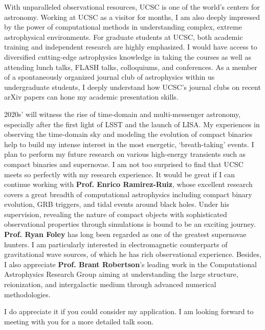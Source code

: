 \documentclass[11pt, a4paper]{awesome-cv} %
\begin{document}
\makecvheader %



\begin{cvletter}




With unparalleled observational resources, UCSC is one of the world’s centers for astronomy. Working at UCSC as a visitor for months, I am also deeply impressed by the power of computational methods in understanding complex, extreme astrophysical environments. For graduate students at UCSC, both academic training and independent research are highly emphasized. I would have access to diversified cutting-edge astrophysics knowledge in taking the courses as well as attending lunch talks, FLASH talks, colloquiums, and conferences. As a member of a spontaneously organized journal club of astrophysics within us undergraduate students, I deeply understand how UCSC's journal clubs on recent arXiv papers can hone my academic presentation skills.

2020s' will witness the rise of time-domain and multi-messenger astronomy, especially after the first light of LSST and the launch of LISA. My experiences in observing the time-domain sky and modeling the evolution of compact binaries help to build my intense interest in the most energetic, `breath-taking’ events. I plan to perform my future research on various high-energy transients such as compact binaries and supernovae. I am not too surprised to find that UCSC meets so perfectly with my research experience. It would be great if I can continue working with \textbf{Prof. Enrico Ramirez-Ruiz}, whose excellent research covers a great breadth of computational astrophysics including compact binary evolution, GRB triggers, and tidal events around black holes. Under his supervision, revealing the nature of compact objects with sophisticated observational properties through simulations is bound to be an exciting journey. \textbf{Prof. Ryan Foley} has long been regarded as one of the greatest supernovae hunters. I am particularly interested in electromagnetic counterparts of gravitational wave sources, of which he has rich observational experience. Besides, I also appreciate \textbf{Prof. Brant Robertson}’s leading work in the Computational Astrophysics Research Group aiming at understanding the large structure, reionization, and intergalactic medium through advanced numerical methodologies.

I do appreciate it if you could consider my application. I am looking forward to meeting with you for a more detailed talk soon.
 
\end{cvletter}


\end{document}
